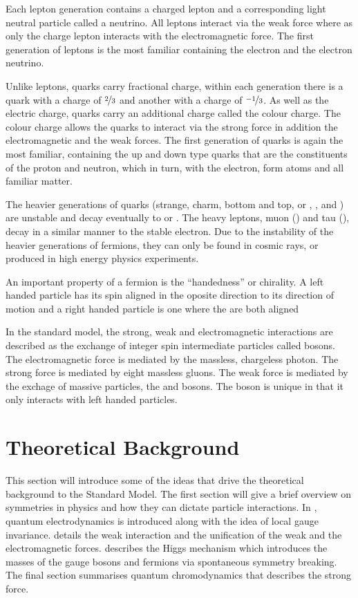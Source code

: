 Each lepton generation contains a charged lepton and a corresponding light
neutral particle called a neutrino. All leptons interact via the weak force
where as only the charge lepton interacts with the electromagnetic force.  The
first generation of leptons is the most familiar containing the electron and the
electron neutrino.

Unlike leptons, quarks carry fractional charge, within each generation there is
a quark with a charge of $\nicefrac{2}{3}$ and another with a charge of
$\nicefrac{-1}{3}$. As well as the electric charge, quarks carry an additional
charge called the colour charge. The colour charge allows the quarks to interact
via the strong force in addition the electromagnetic and the weak forces.
The first generation of quarks is again the most familiar, containing the up and
down type quarks that are the constituents of the proton and neutron, which in
turn, with the electron, form atoms and all familiar matter.


The heavier generations of quarks (strange, charm, bottom and top, or \Pstrange,
\Pcharm, \Pbottom and \Ptop) are unstable and decay eventually to \Pup or
\Pdown.
The heavy leptons, muon (\Pmuon) and tau (\Ptau), decay in a similar manner to
the stable electron. 
Due to the instability of the heavier generations of fermions, they can only be
found in  cosmic rays, or produced in high energy physics experiments.

An important property of a fermion is the ``handedness'' or chirality. A left
handed particle has its spin aligned in the oposite direction to its direction
of motion and a right handed particle is one where the are both aligned

In the standard model, the strong, weak and electromagnetic interactions are
described as the exchange of integer spin intermediate particles called bosons.
The electromagnetic force is mediated by the massless, chargeless photon. The
strong force is mediated by eight massless gluons. 
The weak force is mediated by the exchage of massive particles, the \PWpm and \PZ
bosons. The \PWpm boson is unique in that it only interacts with left handed
particles.



\section{Theoretical Background}
This section will introduce some of the ideas that drive the
theoretical background to the Standard Model.
The first section will give a brief overview on symmetries in physics and how
they can dictate particle interactions. In \SectionRef{}, quantum
electrodynamics is introduced along with the idea of local gauge invariance.
\SectionRef{} details the weak interaction and the unification of the weak 
and the electromagnetic forces. \SectionRef{} describes the Higgs mechanism
which introduces the masses of the gauge bosons and fermions via spontaneous
symmetry breaking. The final section summarises quantum chromodynamics that
describes the strong force.

